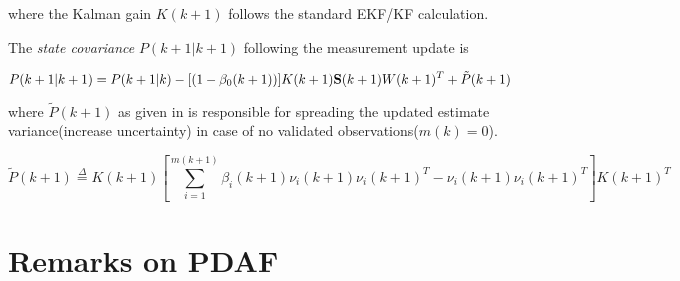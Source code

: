 where the Kalman gain $K(k+1)$ follows the standard EKF/KF calculation.

The \emph{state covariance} $P(k+1|k+1)$ following the measurement update is \cite{Kirubarajan2004}

$$
P(k+1|k+1) = P(k+1|k) -  [ (1-\beta_0(k+1)) ] K(k+1)\mathbf{S}(k+1)W(k+1)^T + \tilde{P}(k+1)
$$

where $\tilde{P}(k+1)$ as given in  is responsible for spreading the updated estimate variance(increase uncertainty) in case of no validated observations($m(k)=0$).


\begin{equation}
\label{eq:spread}
\tilde{P}(k+1) \overset{\Delta}{=} K(k+1)\left[ \sum_{i=1}^{m(k+1)}\beta_i(k+1)\nu_i(k+1)\nu_i(k+1)^T - \nu_i(k+1)\nu_i(k+1)^T \right]K(k+1)^T
\end{equation}

\section{Remarks on PDAF}

